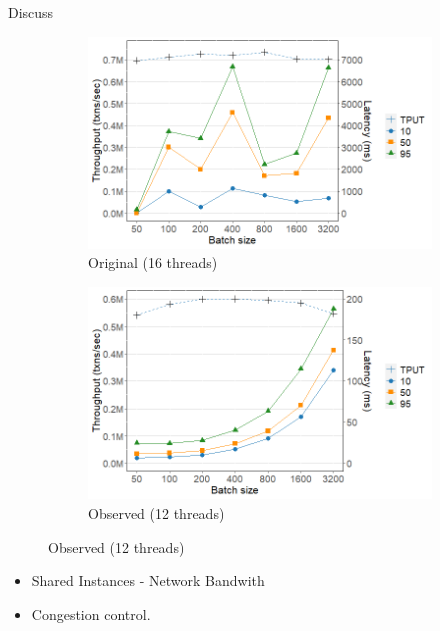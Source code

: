 \documentclass[notes, xcolor=dvipsnames]{beamer}
\begin{document}
    
    \begin{frame}{Discuss}
    
        \begin{figure}
            \begin{subfigure}[h]{0.4\linewidth}
                \includegraphics[scale=0.28]{fig16_16t.png}
                \caption{Original (16 threads)}
            \end{subfigure}
            \hfill
            \begin{subfigure}[h]{0.5\linewidth}
                \includegraphics[scale=0.28]{fig16_12t.png}
                \caption{Observed (12 threads)}
            \end{subfigure}
        \end{figure}

        \begin{itemize}
            \item Shared Instances - Network Bandwith
            \item Congestion control.
        \end{itemize}

    \end{frame}
\end{document}
